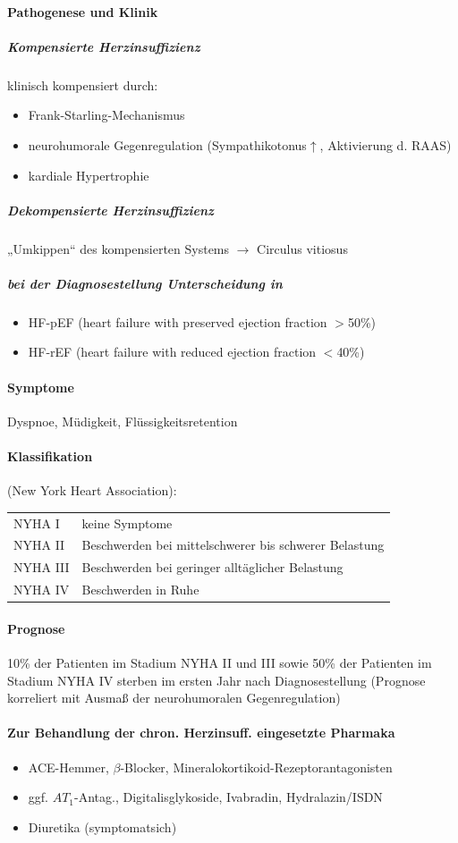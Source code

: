 \documentclass[10pt,a4paper]{report}
\begin{document}
\paragraph{Pathogenese und Klinik}
\subparagraph{Kompensierte Herzinsuffizienz} klinisch kompensiert durch:	
\begin{itemize}
	\item Frank-Starling-Mechanismus
	\item neurohumorale Gegenregulation (Sympathikotonus$\uparrow$, Aktivierung d. RAAS)
	\item kardiale Hypertrophie
\end{itemize}
\subparagraph{Dekompensierte Herzinsuffizienz}
	„Umkippen“ des kompensierten Systems $\rightarrow$ Circulus vitiosus
\subparagraph{bei der Diagnosestellung Unterscheidung in}
\begin{itemize}
	\item HF-pEF (heart failure with preserved ejection fraction $>$50\%)
	\item HF-rEF (heart failure with reduced ejection fraction $<$40\%)
\end{itemize} 
\paragraph{Symptome}Dyspnoe, Müdigkeit, Flüssigkeitsretention
\paragraph{Klassifikation}(New York Heart Association):\\
\begin{tabularx}{\textwidth}{XX}
NYHA I&keine Symptome\\
NYHA II&Beschwerden bei mittelschwerer bis schwerer Belastung\\
NYHA III&Beschwerden bei geringer alltäglicher Belastung\\
NYHA IV&Beschwerden in Ruhe\\
\end{tabularx}
\paragraph{Prognose}10\% der Patienten im Stadium NYHA II und III sowie 50\% der Patienten im Stadium NYHA IV sterben im ersten Jahr nach Diagnosestellung (Prognose korreliert mit  Ausmaß der neurohumoralen Gegenregulation)
\paragraph{Zur Behandlung der chron. Herzinsuff. eingesetzte Pharmaka}
\begin{itemize}
	\item ACE-Hemmer, $\beta$-Blocker,  Mineralokortikoid-Rezeptorantagonisten 
	\item ggf. $AT_1$-Antag., Digitalisglykoside, Ivabradin, Hydralazin/ISDN 
	\item Diuretika (symptomatsich)
\end{itemize}
\end{document}
